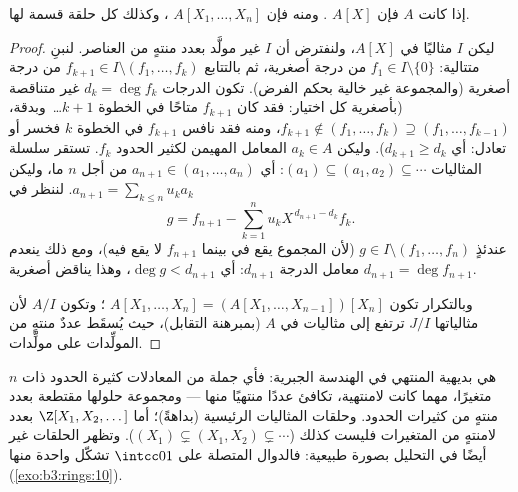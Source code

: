 \begin{theorem}\label{thm:b3:rings:hilbert}
إذا كانت $A$  فإن $A[X]$ . ومنه فإن $A[X_1, \dots,
X_n]$
، وكذلك كل حلقة قسمة لها.
\end{theorem}

\begin{proof}
ليكن $I$ مثاليًا في $A[X]$، ولنفترض أن $I$ غير مولَّد بعدد منتهٍ
من العناصر. لنبنِ متتالية: $f_1 \in I \setminus \{0\}$ من درجة أصغرية، ثم بالتتابع
$f_{k+1} \in I \setminus (f_1,
\dots, f_k)$ من درجة أصغرية (والمجموعة غير خالية بحكم الفرض). تكون
الدرجات $d_k = \deg f_k$ غير متناقصة (بأصغرية كل اختيار: فقد كان
$f_{k+1}$ متاحًا في الخطوة $k+1$\dots\ وبدقة، $f_{k+1} \notin (f_1,\dots,f_k) \supseteq
(f_1, \dots, f_{k-1})$، ومنه فقد
نافس $f_{k+1}$ في الخطوة $k$ فخسر أو تعادل: أي $d_{k+1} \geq d_k$). وليكن
$a_k \in A$ المعامل المهيمن لكثير الحدود $f_k$. تستقر سلسلة المثاليات
$(a_1) \subseteq (a_1,
a_2) \subseteq \cdots$: أي $a_{n+1} \in (a_1, \dots,
a_n)$ من أجل $n$ ما، وليكن $a_{n+1} = \sum_{k\leq n} u_k a_k$. لننظر في
\[
g = f_{n+1} - \sum_{k=1}^{n} u_k X^{\,d_{n+1} - d_k} f_k .
\]
عندئذٍ $g \in I \setminus (f_1, \dots, f_n)$ (لأن المجموع يقع في  بينما $f_{n+1}$ لا
يقع فيه)، ومع ذلك ينعدم معامل الدرجة $d_{n+1}$: أي $\deg g < d_{n+1}$،
وهذا يناقض أصغرية $d_{n+1} = \deg f_{n+1}$.

وبالتكرار تكون $A[X_1, \dots, X_n] = (A[X_1, \dots, X_{n-1}])[X_n]$ ؛ وتكون  $A/I$ 
لأن مثالياتها $J/I$ ترتفع إلى مثاليات في $A$ (بمبرهنة التقابل)،
حيث يُسقَط عددٌ منتهٍ من المولِّدات على مولِّدات.
\end{proof}

\begin{remark}\label{rem:b3:rings:noethmeaning}
 هي بديهية المنتهي في الهندسة الجبرية: فأي جملة من
المعادلات كثيرة الحدود ذات $n$ متغيرًا، مهما كانت لامنتهية، تكافئ
عددًا منتهيًا منها --- ومجموعة حلولها مقتطعة بعدد منتهٍ من
كثيرات الحدود. وحلقات المثاليات الرئيسية  (بداهةً)؛ أما
$\Z[X_1, X_2, \dots]$ بعدد لامنتهٍ من المتغيرات فليست كذلك ($(X_1) \subsetneq (X_1, X_2) \subsetneq \cdots$). وتظهر
الحلقات غير  أيضًا في التحليل بصورة طبيعية: فالدوال
المتصلة على $\intcc01$ تشكّل واحدة منها (\cref{exo:b3:rings:10}).
\end{remark}

